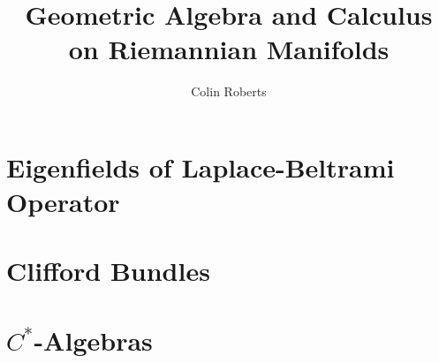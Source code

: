 \documentclass[12pt]{article}
\title{Geometric Algebra and Calculus on Riemannian Manifolds}
\author{Colin Roberts}
\begin{document}
\maketitle

\section{Eigenfields of Laplace-Beltrami Operator}


\section{Clifford Bundles}


\section{$C^*$-Algebras}



 
\end{document}
